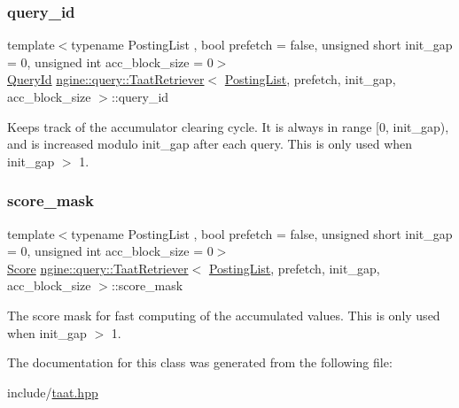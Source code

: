 \subsubsection{\texorpdfstring{query\+\_\+id}{query\_id}}
{\footnotesize\ttfamily template$<$typename Posting\+List , bool prefetch = false, unsigned short init\+\_\+gap = 0, unsigned int acc\+\_\+block\+\_\+size = 0$>$ \\
\hyperlink{namespacengine_1_1query_a3deddbc36af48dca2072f880a752b001}{Query\+Id} \hyperlink{classngine_1_1query_1_1TaatRetriever}{ngine\+::query\+::\+Taat\+Retriever}$<$ \hyperlink{classngine_1_1PostingList}{Posting\+List}, prefetch, init\+\_\+gap, acc\+\_\+block\+\_\+size $>$\+::query\+\_\+id\hspace{0.3cm}{\ttfamily [protected]}}

Keeps track of the accumulator clearing cycle. It is always in range \mbox{[}0, init\+\_\+gap), and is increased modulo init\+\_\+gap after each query. This is only used when init\+\_\+gap $>$ 1. \mbox{\label{classngine_1_1query_1_1TaatRetriever_a2aadff690e54f22078b1bca5102c8bd0}} 
\subsubsection{\texorpdfstring{score\+\_\+mask}{score\_mask}}
{\footnotesize\ttfamily template$<$typename Posting\+List , bool prefetch = false, unsigned short init\+\_\+gap = 0, unsigned int acc\+\_\+block\+\_\+size = 0$>$ \\
\hyperlink{structngine_1_1Score}{Score} \hyperlink{classngine_1_1query_1_1TaatRetriever}{ngine\+::query\+::\+Taat\+Retriever}$<$ \hyperlink{classngine_1_1PostingList}{Posting\+List}, prefetch, init\+\_\+gap, acc\+\_\+block\+\_\+size $>$\+::score\+\_\+mask\hspace{0.3cm}{\ttfamily [protected]}}

The score mask for fast computing of the accumulated values. This is only used when init\+\_\+gap $>$ 1. 

The documentation for this class was generated from the following file\+:\begin{DoxyCompactItemize}
\item 
include/\hyperlink{taat_8hpp}{taat.\+hpp}\end{DoxyCompactItemize}
